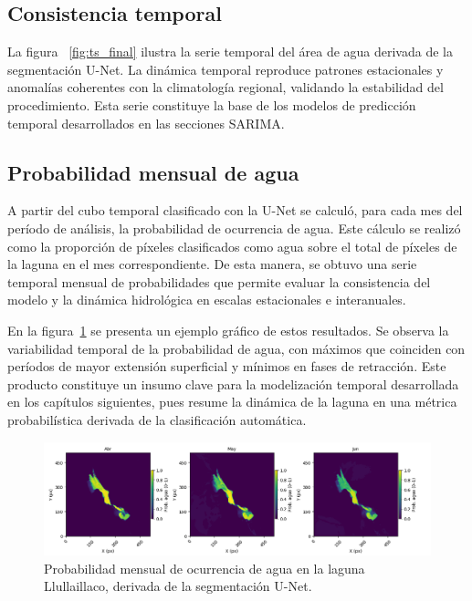 \subsection{Consistencia temporal}
La figura ~\ref{fig:ts_final} ilustra la serie temporal del área de agua derivada de la segmentación U-Net. La dinámica temporal reproduce patrones estacionales y anomalías coherentes con la climatología regional, validando la estabilidad del procedimiento. Esta serie constituye la base de los modelos de predicción temporal desarrollados en las secciones SARIMA.

\subsection{Probabilidad mensual de agua}

A partir del cubo temporal clasificado con la U-Net se calculó, para cada mes del período de análisis, la probabilidad de ocurrencia de agua. Este cálculo se realizó como la proporción de píxeles clasificados como agua sobre el total de píxeles de la laguna en el mes correspondiente. De esta manera, se obtuvo una serie temporal mensual de probabilidades que permite evaluar la consistencia del modelo y la dinámica hidrológica en escalas estacionales e interanuales.

En la figura~\ref{fig:prob_agua_mensual} se presenta un ejemplo gráfico de estos resultados. Se observa la variabilidad temporal de la probabilidad de agua, con máximos que coinciden con períodos de mayor extensión superficial y mínimos en fases de retracción. Este producto constituye un insumo clave para la modelización temporal desarrollada en los capítulos siguientes, pues resume la dinámica de la laguna en una métrica probabilística derivada de la clasificación automática.

\begin{figure}[H]
    \centering
    \includegraphics[scale=0.31]{Figures/prob_agua1.png}
    \caption{Probabilidad mensual de ocurrencia de agua en la laguna Llullaillaco, derivada de la segmentación U-Net.}
    \label{fig:prob_agua_mensual}
\end{figure}

